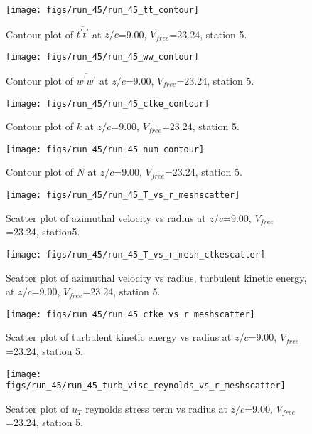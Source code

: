 \begin{figure}[H]
\centering
\texttt{[image: figs/run\_45/run\_45\_tt\_contour]}
\caption{Contour plot of $\overline{t^\prime t^\prime}$ at $z/c$=9.00, $V_{free}$=23.24, station 5.}
\end{figure}


\begin{figure}[H]
\centering
\texttt{[image: figs/run\_45/run\_45\_ww\_contour]}
\caption{Contour plot of $\overline{w^\prime w^\prime}$ at $z/c$=9.00, $V_{free}$=23.24, station 5.}
\end{figure}


\begin{figure}[H]
\centering
\texttt{[image: figs/run\_45/run\_45\_ctke\_contour]}
\caption{Contour plot of $k$ at $z/c$=9.00, $V_{free}$=23.24, station 5.}
\end{figure}


\begin{figure}[H]
\centering
\texttt{[image: figs/run\_45/run\_45\_num\_contour]}
\caption{Contour plot of $N$ at $z/c$=9.00, $V_{free}$=23.24, station 5.}
\end{figure}


\begin{figure}[H]
\centering
\texttt{[image: figs/run\_45/run\_45\_T\_vs\_r\_meshscatter]}
\caption{Scatter plot of azimuthal velocity vs radius at $z/c$=9.00, $V_{free}$=23.24, station5.}
\end{figure}


\begin{figure}[H]
\centering
\texttt{[image: figs/run\_45/run\_45\_T\_vs\_r\_mesh\_ctkescatter]}
\caption{Scatter plot of azimuthal velocity vs radius, turbulent kinetic energy, at $z/c$=9.00, $V_{free}$=23.24, station 5.}
\end{figure}


\begin{figure}[H]
\centering
\texttt{[image: figs/run\_45/run\_45\_ctke\_vs\_r\_meshscatter]}
\caption{Scatter plot of turbulent kinetic energy vs radius at $z/c$=9.00, $V_{free}$=23.24, station 5.}
\end{figure}


\begin{figure}[H]
\centering
\texttt{[image: figs/run\_45/run\_45\_turb\_visc\_reynolds\_vs\_r\_meshscatter]}
\caption{Scatter plot of $
u_T$ reynolds stress term vs radius at $z/c$=9.00, $V_{free}$=23.24, station 5.}
\end{figure}


